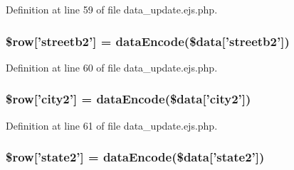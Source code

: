 \-Definition at line 59 of file data\-\_\-update.\-ejs.\-php.

\hypertarget{miscellaneous_2mysettings_2data__update_8ejs_8php_a8ea62ae310fd8899b5da0f1522723386}{
\subsubsection[{\$row}]{\setlength{\rightskip}{0pt plus 5cm}\$row\mbox{[}'streetb2'\mbox{]} = {\bf data\-Encode}(\$data\mbox{[}'streetb2'\mbox{]})}}\label{miscellaneous_2mysettings_2data__update_8ejs_8php_a8ea62ae310fd8899b5da0f1522723386}


\-Definition at line 60 of file data\-\_\-update.\-ejs.\-php.

\hypertarget{miscellaneous_2mysettings_2data__update_8ejs_8php_aa610cd56bbcf4b9d3b2e212c30180df4}{
\subsubsection[{\$row}]{\setlength{\rightskip}{0pt plus 5cm}\$row\mbox{[}'city2'\mbox{]} = {\bf data\-Encode}(\$data\mbox{[}'city2'\mbox{]})}}\label{miscellaneous_2mysettings_2data__update_8ejs_8php_aa610cd56bbcf4b9d3b2e212c30180df4}


\-Definition at line 61 of file data\-\_\-update.\-ejs.\-php.

\hypertarget{miscellaneous_2mysettings_2data__update_8ejs_8php_a073dd913d0ed16cf9cd0044d0e0aaa6d}{
\subsubsection[{\$row}]{\setlength{\rightskip}{0pt plus 5cm}\$row\mbox{[}'state2'\mbox{]} = {\bf data\-Encode}(\$data\mbox{[}'state2'\mbox{]})}}\label{miscellaneous_2mysettings_2data__update_8ejs_8php_a073dd913d0ed16cf9cd0044d0e0aaa6d}


